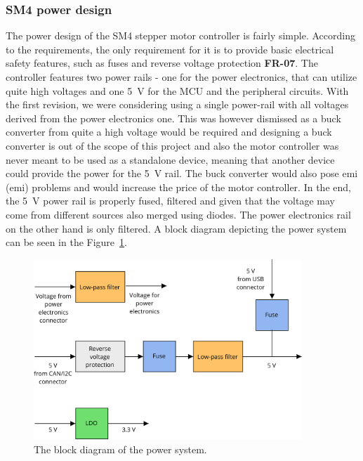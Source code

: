 \subsubsection{SM4 power design}
\label{subsubsec:power_design}
The power design of the SM4 stepper motor controller is fairly simple.
According to the requirements, the only requirement for it is to provide basic electrical safety features, such as fuses and reverse voltage protection \textbf{FR-07}.
The controller features two power rails - one for the power electronics, that can utilize quite high voltages and one 5~V for the MCU and the peripheral circuits.
With the first revision, we were considering using a single power-rail with all voltages derived from the power electronics one.
This was however dismissed as a buck converter from quite a high voltage would be required and designing a buck converter is out of the scope of this project and also the motor controller was never meant to be used as a standalone device, meaning that another device could provide the power for the 5~V rail.
The buck converter would also pose \acs{emi} (\acl{emi}) problems and would increase the price of the motor controller.
In the end, the 5~V power rail is properly fused, filtered and given that the voltage may come from different sources also merged using diodes.
The power electronics rail on the other hand is only filtered.
A block diagram depicting the power system can be seen in the Figure~\ref{fig:power_diagram}.

\begin{figure}[H]
    \centering
    \includegraphics[width=0.9\textwidth]{obrazky/power_block_diagram}
    \caption{The block diagram of the power system.}
    \label{fig:power_diagram}
\end{figure}


